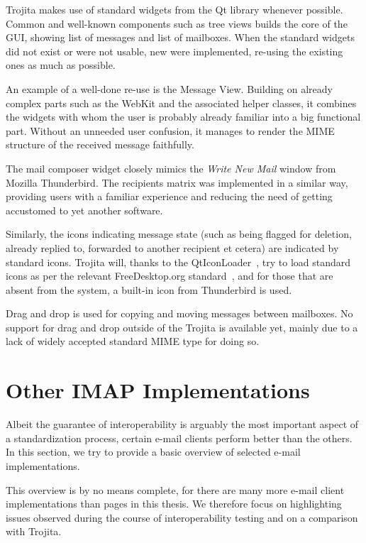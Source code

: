 \documentclass[12pt,notitlepage]{report}
\newcommand{\trojita}{Trojita\xspace}
\begin{document}
\trojita makes use of standard widgets from the Qt library whenever possible.
Common and well-known components such as tree views builds the core of the GUI,
showing list of messages and list of mailboxes.  When the standard widgets did
not exist or were not usable, new were implemented, re-using the existing ones
as much as possible.

An example of a well-done re-use is the Message View.  Building on already
complex parts such as the WebKit and the associated helper classes, it combines
the widgets with whom the user is probably already familiar into a big
functional part.  Without an unneeded user confusion, it manages to render the
MIME structure of the received message faithfully.

The mail composer widget closely mimics the {\em Write New Mail} window from
Mozilla Thunderbird.  The recipients matrix was implemented in a similar way,
providing users with a familiar experience and reducing the need of getting
accustomed to yet another software.

Similarly, the icons indicating message state (such as being flagged for
deletion, already replied to, forwarded to another recipient et cetera) are
indicated by standard icons.  \trojita will, thanks to the
QtIconLoader~\cite{qticonloader}, try to load standard icons as per the relevant
FreeDesktop.org standard~\cite{xdg-icons}, and for those that are absent from
the system, a built-in icon from Thunderbird is used.

Drag and drop is used for copying and moving messages between mailboxes.  No
support for drag and drop outside of the \trojita is available yet, mainly due
to a lack of widely accepted standard MIME type for doing so.

\chapter{Other IMAP Implementations}
\label{other-imap-implementations}

Albeit the guarantee of interoperability is arguably the most important aspect
of a standardization process, certain e-mail clients perform better than the
others.  In this section, we try to provide a basic overview of selected e-mail
implementations.

This overview is by no means complete, for there are many more e-mail client
implementations than pages in this thesis.  We therefore focus on highlighting
issues observed during the course of interoperability testing and on a
comparison with \trojita.
\end{document}
